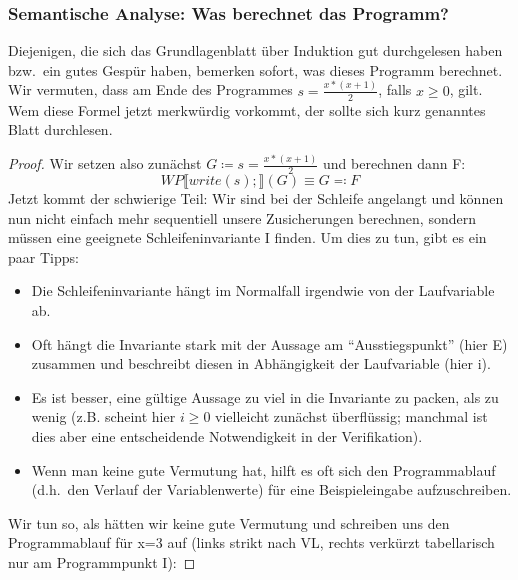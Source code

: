 \documentclass[hidelinks]{article}
\theoremstyle{plain}
\theoremstyle{definition}
\theoremstyle{rem}
\begin{document}
\begin{sloppypar}
\subsubsection{Semantische Analyse: Was berechnet das Programm?}
Diejenigen, die sich das Grundlagenblatt über Induktion gut durchgelesen haben bzw.\ ein gutes Gespür haben, bemerken sofort, was dieses Programm berechnet. Wir vermuten, dass am Ende des Programmes $s=\frac{x*(x+1)}{2}$, falls $x\ge 0$, gilt. Wem diese Formel jetzt merkwürdig vorkommt, der sollte sich kurz genanntes Blatt durchlesen.
\begin{proof}
Wir setzen also zunächst $G\coloneqq s=\frac{x*(x+1)}{2}$ und berechnen dann F:
\begin{equation*}
WP\llbracket write(s);\rrbracket(G)\equiv G\eqqcolon F 
\end{equation*}
Jetzt kommt der schwierige Teil: Wir sind bei der Schleife angelangt und können nun nicht einfach mehr sequentiell unsere Zusicherungen berechnen, sondern müssen eine geeignete Schleifeninvariante I finden. Um dies zu tun, gibt es ein paar Tipps:
\begin{itemize}
\item Die Schleifeninvariante hängt im Normalfall irgendwie von der Laufvariable ab.
\item Oft hängt die Invariante stark mit der Aussage am ``Ausstiegspunkt'' (hier E) zusammen und beschreibt diesen in Abhängigkeit der Laufvariable (hier i).
\item Es ist besser, eine gültige Aussage zu viel in die Invariante zu packen, als zu wenig (z.B. scheint hier $i\ge 0$ vielleicht zunächst überflüssig; manchmal ist dies aber eine entscheidende Notwendigkeit in der Verifikation).
\item Wenn man keine gute Vermutung hat, hilft es oft sich den Programmablauf (d.h.\ den Verlauf der Variablenwerte) für eine Beispieleingabe aufzuschreiben.
\end{itemize}
Wir tun so, als hätten wir keine gute Vermutung und schreiben uns den Programmablauf für x=3 auf (links strikt nach VL, rechts verkürzt tabellarisch nur am Programmpunkt I):
\fboxsep=0pt
\end{proof}
\end{sloppypar}
\end{document}
